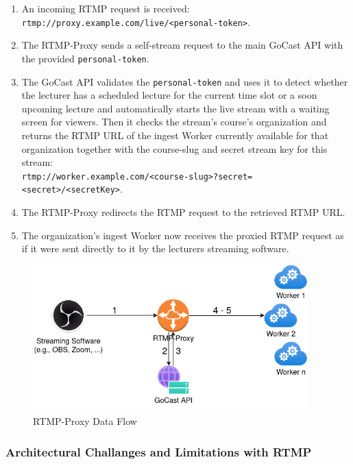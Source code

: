 \begin{enumerate}
    \item An incoming \ac{RTMP} request is received:\\
    \texttt{rtmp://proxy.example.com/live/<personal-token>}.
    \item The RTMP-Proxy sends a self-stream request to the main GoCast \ac{API} with the provided \texttt{personal-token}.
    \item The GoCast \ac{API} validates the \texttt{personal-token} and uses it to detect whether the lecturer has a scheduled lecture for the current time slot or a soon upcoming lecture and automatically starts the live stream with a waiting screen for viewers. Then it checks the stream's course's organization and returns the \ac{RTMP} URL of the ingest Worker currently available for that organization together with the course-slug and secret stream key for this stream: \\ 
    \texttt{rtmp://worker.example.com/<course-slug>?secret=<secret>/<secretKey>}.
    \item The RTMP-Proxy redirects the \ac{RTMP} request to the retrieved \ac{RTMP} URL.
    \item The organization's ingest Worker now receives the proxied \ac{RTMP} request as if it were sent directly to it by the lecturers streaming software.
\end{enumerate}

\begin{figure}[htpb]
    \centering
    \includegraphics[width=300pt]{images/RtmpProxy.png}
    \caption[RTMP-Proxy Flow]{RTMP-Proxy Data Flow}\label{fig:rtmp-proxy}
\end{figure}

\subsubsection{Architectural Challanges and Limitations with RTMP}

